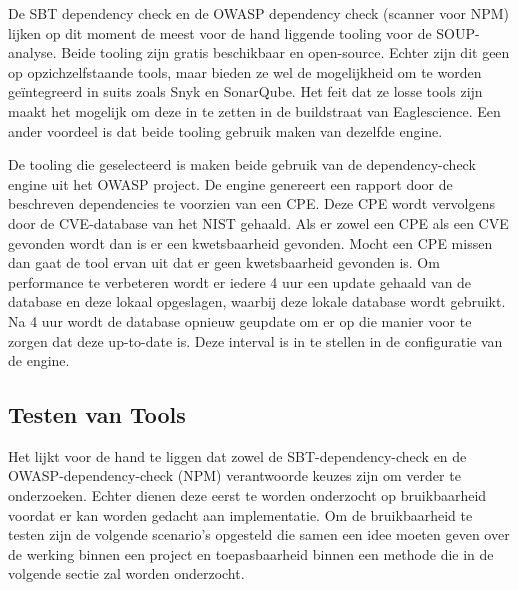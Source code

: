 De SBT dependency check en de OWASP dependency check (scanner voor NPM) lijken op dit moment de meest voor de hand liggende tooling voor de SOUP-analyse. Beide tooling zijn gratis beschikbaar en open-source. Echter zijn dit geen op opzichzelfstaande tools, maar bieden ze wel de mogelijkheid om te worden geïntegreerd in suits zoals Snyk en SonarQube. Het feit dat ze losse tools zijn maakt het mogelijk om deze in te zetten in de buildstraat van Eaglescience. Een ander voordeel is dat beide tooling gebruik maken van dezelfde engine.


De tooling die geselecteerd is maken beide gebruik van de dependency-check engine uit het OWASP project.
De engine genereert een rapport door de beschreven dependencies te voorzien van een CPE. Deze CPE wordt vervolgens door de CVE-database van het NIST gehaald. Als er zowel een CPE als een CVE gevonden wordt dan is er een kwetsbaarheid gevonden. Mocht een CPE missen dan gaat de tool ervan uit dat er geen kwetsbaarheid gevonden is. Om performance te verbeteren wordt er iedere 4 uur een update gehaald van de database en deze lokaal opgeslagen, waarbij deze lokale database wordt gebruikt. Na 4 uur wordt de database opnieuw geupdate om er op die manier voor te zorgen dat deze up-to-date is. Deze interval is in te stellen in de configuratie van de engine.

%
%

\subsection{Testen van Tools}\label{subsec:testen-van-tools}

Het lijkt voor de hand te liggen dat zowel de SBT-dependency-check en de OWASP-dependency-check (NPM) verantwoorde keuzes zijn om verder te onderzoeken. Echter dienen deze eerst te worden onderzocht op bruikbaarheid voordat er kan worden gedacht aan implementatie. Om de bruikbaarheid te testen zijn de volgende scenario's opgesteld die samen een idee moeten geven over de werking binnen een project en toepasbaarheid binnen een methode die in de volgende sectie zal worden onderzocht.

